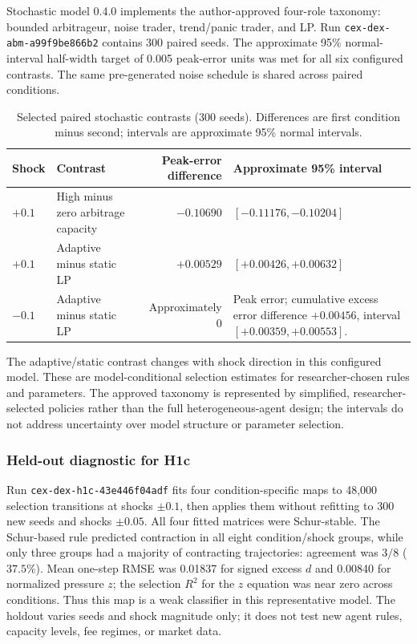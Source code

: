 Stochastic model 0.4.0 implements the author-approved four-role taxonomy: bounded
arbitrageur, noise trader, trend/panic trader, and LP. Run
\texttt{cex-dex-abm-a99f9be866b2} contains 300 paired seeds. The approximate 95\%
normal-interval half-width target of 0.005 peak-error units was met for all six
configured contrasts. The same pre-generated noise schedule is shared across paired
conditions.

\begin{table}[!ht]
\centering
\scriptsize
\caption{Selected paired stochastic contrasts (300 seeds). Differences are first
condition minus second; intervals are approximate 95\% normal intervals.}
\begin{tabularx}{\textwidth}{@{}>{\raggedright\arraybackslash}p{3.3cm} >{\raggedright\arraybackslash}p{3cm} r X@{}}
\toprule
\textbf{Shock} & \textbf{Contrast} & \textbf{Peak-error difference} &
\textbf{Approximate 95\% interval} \\
\midrule
$+0.1$ & High minus zero arbitrage capacity & $-0.10690$ & $[-0.11176,-0.10204]$ \\
$+0.1$ & Adaptive minus static LP & $+0.00529$ & $[+0.00426,+0.00632]$ \\
$-0.1$ & Adaptive minus static LP & Approximately $0$ & Peak error; cumulative excess
  error difference $+0.00456$, interval $[+0.00359,+0.00553]$. \\
\bottomrule
\end{tabularx}
\end{table}

The adaptive/static contrast changes with shock direction in this configured model.
These are model-conditional selection estimates for researcher-chosen rules and
parameters. The approved taxonomy is represented by simplified, researcher-selected policies
rather than the full heterogeneous-agent design; the intervals do not address
uncertainty over model structure or parameter selection.

\subsubsection{Held-out diagnostic for H1c}

Run \texttt{cex-dex-h1c-43e446f04adf} fits four condition-specific maps to 48,000
selection transitions at shocks $\pm0.1$, then applies them without refitting to 300
new seeds and shocks $\pm0.05$. All four fitted matrices were Schur-stable. The
Schur-based rule predicted contraction in all eight condition/shock groups, while
only three groups had a majority of contracting trajectories: agreement was $3/8$
($37.5\%$). Mean one-step RMSE was 0.01837 for signed excess $d$ and 0.00840 for
normalized pressure $z$; the selection $R^2$ for the $z$ equation was near zero across
conditions. Thus this map is a weak classifier in this representative model. The
holdout varies seeds and shock magnitude only; it does not test new agent rules,
capacity levels, fee regimes, or market data.

